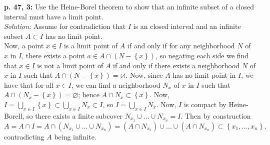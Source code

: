 \documentclass[a4paper]{article}
\begin{document}
    \textbf{p. 47, 3:} Use the Heine-Borel theorem to show that an infinite subset of
    a closed interval must have a limit point.\\
    \linebreak
   \textit{Solution:} Assume for contradiction that $I$ is an closed interval
   and an infinite subset $A \subset I$ has no limit point.\\
   Now, a point $x \in I$ is a limit point of $A$ if and only if for any
   neighborhood $N$ of $x$ in $I$, there exists a point $a \in A \cap (N- \left\{
   x \right\} )$, so negating each side we find that
   $x \in I$ is not a limit point of $A$ if and only if there exists
   a neighborhood $N$ of $x$ in $I$ such that 
   $A \cap \left( N-\left\{ x \right\}  \right) = \varnothing$. Now, since
   $A$ has no limit point in $I$, we have that for all $x \in I$, we can find
   a neighborhood  $N_x$ of $x$ in $I$ such that $A\cap (N_x - \left\{ x \right\}
   ) = \varnothing$; hence
   $A \cap N_x \subset \left\{ x \right\} $. Now, $I = \bigcup_{x \in I} \left\{ x \right\} 
   \subset \bigcup_{x \in I} N_x \subset I$, so
   $I = \bigcup_{x \in I} N_x$. Now, $I$ is compact by Heine-Borell, so
   there exists a finite subcover $N_{x_1}\cup \ldots \cup N_{x_n} = I$. 
   Then by construction
   \[
       A =  A \cap I = A \cap \left( N_{x_1} \cup \ldots \cup N_{x_n} \right) 
       = \left( A \cap N_{x_1} \right) \cup \ldots
       \cup \left( A \cap N_{x_n} \right) 
   \subset \left\{ x_1 , \ldots , x_n \right\},
   \] 
   contradicting $A$ being infinite.\\
   \linebreak
   
   
\end{document}
